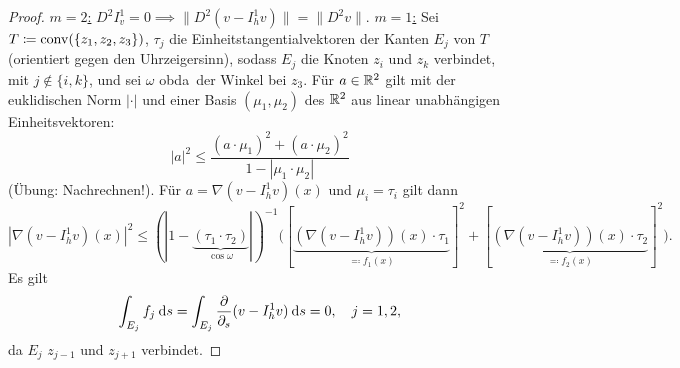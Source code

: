 \documentclass[../skript.tex]{subfiles}
\begin{document}
\begin{proof}
	\underline{$m=2$:} $D^2 I^1_v = 0 \implies \| D^2(v-I_h^1 v)\| = \|D^2 v\|$.
	\underline{$m=1$:} Sei $T \coloneqq \operatorname{conv}(\{z_1,z_2,z_3\})$, $\tau_j$ die Einheitstangentialvektoren der Kanten $E_j$ von $T$ (orientiert gegen den Uhrzeigersinn), sodass $E_j$ die Knoten $z_i$ und $z_k$ verbindet, mit $j\not\in\{i,k\}$, und sei $\omega$ \ac{obda}\ der Winkel bei $z_3$. Für $a\in\mathbb{R}^2$ gilt mit der euklidischen Norm $|\cdot|$ und einer Basis $(\mu_1,\mu_2)$ des $\mathbb{R}^2$ aus linear unabhängigen Einheitsvektoren:
	\[
		| a|^2 \leq \frac{(a\cdot\mu_1)^2 + (a\cdot\mu_2)^2}{1- |\mu_1\cdot\mu_2|}
	\]
	(Übung: Nachrechnen!). 
	Für $a = \nabla(v-I_h^1 v)(x)$ und $\mu_i = \tau_i$ gilt dann
	\[
		|\nabla(v-I_h^1 v)(x)|^2\leq (| 1-\underbrace{(\tau_1\cdot\tau_2)}_{\cos{\omega}}| )^{-1}\big( [\underbrace{(\nabla(v-I_h^1 v))(x)\cdot\tau_1}_{\eqqcolon f_1(x)}]^2 + [\underbrace{(\nabla(v-I_h^1 v))(x)\cdot\tau_2}_{\eqqcolon f_2(x)}]^2 \big).
	\] 
	Es gilt
	\[
		\int_{E_j} f_j \:\mathrm{d}s = \int_{E_j}\frac{\partial}{\partial_s}(v-I_h^1 v) \:\mathrm{d}s = 0,\quad j=1,2,
	\]
	da $E_j$ $z_{j-1}$ und $z_{j+1}$ verbindet.


\end{proof}
\end{document}
